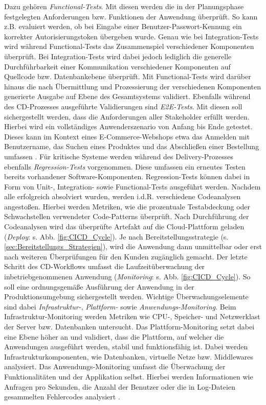 Dazu gehören \textit{Functional-Tests}. Mit diesen werden die in der Planungsphase festgelegten Anforderungen bzw. Funktionen der Anwendung überprüft. So kann z.B. evaluiert werden, ob bei Eingabe einer Benutzer-Passwort-Kennung ein korrekter Autorisierungstoken übergeben wurde. Genau wie bei Integration-Tests wird während Functional-Tests das Zusammenspiel verschiedener Komponenten überprüft. Bei Integration-Tests wird dabei jedoch lediglich die generelle Durchführbarkeit einer Kommunikation verschiedener Komponenten auf Quellcode bzw. Datenbankebene überprüft. Mit Functional-Tests wird darüber hinaus die nach Übermittlung und Prozessierung der verschiedenen Komponenten generierte Ausgabe auf Ebene des Gesamtsystems validiert. Ebenfalls während des CD-Prozesses ausgeführte Validierungen sind \textit{\ac{E2E-Tests}}. Mit diesen soll sichergestellt werden, dass die Anforderungen aller Stakeholder erfüllt werden. Hierbei wird ein vollständiges Anwenderszenario von Anfang bis Ende getestet. Dieses kann im Kontext eines E-Commerce-Webshops etwa das Anmelden mit Benutzername, das Suchen eines Produktes und das Abschließen einer Bestellung umfassen \cite{Bose.20230220}. Für kritische Systeme werden während des Delivery-Prozesses ebenfalls \textit{Regression-Tests} vorgenommen. Diese umfassen ein erneutes Testen bereits vorhandener Software-Komponenten. Regression-Tests können dabei in Form von Unit-, Integration- sowie Functional-Tests ausgeführt werden. Nachdem alle erfolgreich absolviert wurden, werden i.d.R. verschiedene Codeanalysen angestoßen. Hierbei werden Metriken, wie die prozentuale Testabdeckung oder Schwachstellen verwendeter Code-Patterns überprüft. Nach Durchführung der Codeanalysen wird das überprüfte Artefakt auf die Cloud-Plattform geladen (\textit{Deploy}: s. Abb. \ref*{fig:CICD_Cycle}). Je nach Bereitstellungsstrategie (s. \ref*{sec:Bereitstellungs_Strategien}), wird die Anwendung dann unmittelbar oder erst nach weiteren Überprüfungen für den Kunden zugänglich gemacht. Der letzte Schritt des CD-Workflows umfasst die Laufzeitüberwachung der inbetriebgenommenen Anwendung (\textit{Monitoring}: s. Abb. \ref*{fig:CICD_Cycle}). So soll eine ordnungsgemäße Ausführung der Anwendung in der Produktionsumgebung sichergestellt werden. Wichtige Überwachungselemente sind dabei \textit{Infrastruktur-}, \textit{Plattform-} sowie \textit{Anwendungs-Monitoring}. Beim Infrastruktur-Monitoring werden Metriken wie CPU-, Speicher- und Netzwerklast der Server bzw. Datenbanken untersucht. Das Plattform-Monitoring setzt dabei eine Ebene höher an und validiert, dass die Plattform, auf welcher die Anwendungen ausgeführt werden, stabil und funktionsfähig ist. Dabei werden Infrastrukturkomponenten, wie Datenbanken, virtuelle Netze bzw. Middlewares analysiert. Das Anwendungs-Monitoring umfasst die Überwachung der Funktionalitäten und der Applikation selbst. Hierbei werden Informationen wie Anfragen pro Sekunden, die Anzahl der Benutzer oder die in Log-Dateien gesammelten Fehlercodes analysiert \cite[21]{Halstenberg.2020}.\\ 
